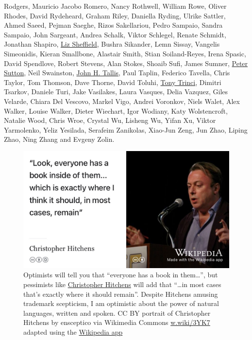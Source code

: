 \documentclass[
]{book}
\begin{document}
Rodgers, Mauricio Jacobo Romero, Nancy Rothwell, William Rowe, Oliver Rhodes, David Rydeheard, Graham Riley, Daniella Ryding, Ulrike Sattler, Ahmed Saeed, Pejman Saeghe, Rizos Sakellariou, Pedro Sampaio, Sandra Sampaio, John Sargeant, Andrea Schalk, Viktor Schlegel, Renate Schmidt, Jonathan Shapiro, \href{https://www.manchester.ac.uk/discover/governance/structure/board-governors/members/liz-sheffield/}{Liz Sheffield}, Bushra Sikander, Lemn Sissay, Vangelis Simeonidis, Kieran Smallbone, Alastair Smith, Stian Soiland-Reyes, Irena Spasic, David Spendlove, Robert Stevens, Alan Stokes, Shoaib Sufi, James Sumner, \href{https://github.com/dj-foxxy}{Peter Sutton}, Neil Swainston, \href{https://www.springer.com/gp/book/9780412303203}{John H. Tallis}, Paul Taplin, Federico Tavella, Chris Taylor, Tom Thomson, Dave Thorne, David Toluhi, \href{https://www.theguardian.com/science/2020/nov/10/tony-trinci-obituary}{Tony Trinci}, Dimitri Tsarkov, Daniele Turi, Jake Vasilakes, Laura Vasques, Delia Vazquez, Giles Velarde, Chiara Del Vescovo, Markel Vigo, Andrei Voronkov, Niels Walet, Alex Walker, Louise Walker, Dieter Wiechart, Igor Wodiany, Katy Wolstencroft, Natalie Wood, Chris Wroe, Crystal Wu, Lisheng Wu, Yifan Xu, Viktor Yarmolenko, Yeliz Yesilada, Serafeim Zanikolas, Xiao-Jun Zeng, Jun Zhao, Liping Zhao, Ning Zhang and Evgeny Zolin.

\begin{figure}

{\centering \includegraphics[width=0.99\linewidth]{images/everyone-has-a-book-inside-them} 

}

\caption{Optimists will tell you that ``everyone has a book in them\ldots{}'', but pessimists like \href{https://en.wikipedia.org/wiki/Christopher_Hitchens}{Christopher Hitchens} will add that ``\ldots in most cases that's exactly where it should remain''. \citep{everyone} Despite Hitchens amusing trademark scepticism, I am optimistic about the power of natural languages, written and spoken. CC BY portrait of Christopher Hitchens by ensceptico via Wikimedia Commons \href{https://w.wiki/3YK7}{w.wiki/3YK7} adapted using the \href{https://apps.apple.com/us/app/wikipedia/id324715238}{Wikipedia app}}\label{fig:hitchens-fig}
\end{figure}
\end{document}
